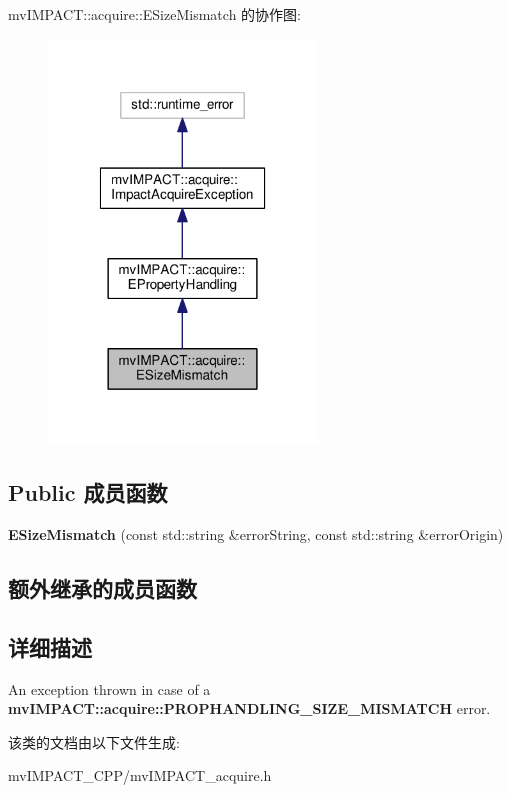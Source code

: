 mv\+I\+M\+P\+A\+C\+T\+:\+:acquire\+:\+:E\+Size\+Mismatch 的协作图\+:
\nopagebreak
\begin{figure}[H]
\begin{center}
\leavevmode
\includegraphics[width=202pt]{classmv_i_m_p_a_c_t_1_1acquire_1_1_e_size_mismatch__coll__graph}
\end{center}
\end{figure}
\subsection*{Public 成员函数}
\begin{DoxyCompactItemize}
\item 
\hypertarget{classmv_i_m_p_a_c_t_1_1acquire_1_1_e_size_mismatch_a49e5e7ae62b62bfd73e7282e586f1af1}{{\bfseries E\+Size\+Mismatch} (const std\+::string \&error\+String, const std\+::string \&error\+Origin)}\label{classmv_i_m_p_a_c_t_1_1acquire_1_1_e_size_mismatch_a49e5e7ae62b62bfd73e7282e586f1af1}

\end{DoxyCompactItemize}
\subsection*{额外继承的成员函数}


\subsection{详细描述}
An exception thrown in case of a {\bfseries mv\+I\+M\+P\+A\+C\+T\+::acquire\+::\+P\+R\+O\+P\+H\+A\+N\+D\+L\+I\+N\+G\+\_\+\+S\+I\+Z\+E\+\_\+\+M\+I\+S\+M\+A\+T\+C\+H} error. 

该类的文档由以下文件生成\+:\begin{DoxyCompactItemize}
\item 
mv\+I\+M\+P\+A\+C\+T\+\_\+\+C\+P\+P/mv\+I\+M\+P\+A\+C\+T\+\_\+acquire.\+h\end{DoxyCompactItemize}
